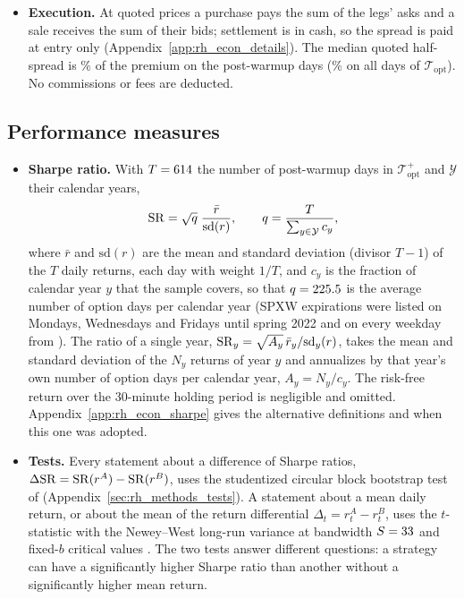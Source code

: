 \begin{itemize}
  (Table~\ref{tab:rh_oos}). On the HAR benchmark set the ridge, lasso and elastic-net forecasts coincide with
  the OLS (Table~\ref{tab:rh_econ_main}, note b), so the six HAR-set strategies hold \rhemHarDistinctWord{} distinct
  forecasts.
\item \textbf{Execution.} At quoted prices a purchase pays the sum of the legs' asks and a sale receives the sum of
  their bids; settlement is in cash, so the spread is paid at entry only (Appendix~\ref{app:rh_econ_details}). The
  median quoted half-spread is \rhemHalfSpreadMed\% of the premium on the \rheSzDays{} post-warmup days
  (\rhemHalfSpreadMedAll\% on all \cmNdays{} days of $\mathcal T_{\mathrm{opt}}$). No commissions or fees are
  deducted.
\end{itemize}

\subsection{Performance measures}
\label{sec:rh_econ_measures}
\begin{itemize}
\item \textbf{Sharpe ratio.} With $T = 614$ the number of post-warmup days in $\mathcal T_{\mathrm{opt}}^{+}$
  and $\mathcal Y$ their \rheNYears{} calendar years,
  \[
    \mathrm{SR} = \sqrt{q}\;\frac{\bar r}{\mathrm{sd}(r)},
    \qquad
    q = \frac{T}{\sum_{y \in \mathcal Y} c_y},
  \]
  where $\bar r$ and $\mathrm{sd}(r)$ are the mean and standard deviation (divisor $T - 1$) of the $T$ daily returns,
  each day with weight $1/T$, and $c_y$ is the fraction of calendar year $y$ that the sample covers, so that
  $q = 225.5$ is the average number of option days per calendar year (SPXW expirations were listed on Mondays,
  Wednesdays and Fridays until spring 2022 and on every weekday from \rheSplitDate). The ratio of a single year,
  $\mathrm{SR}_y = \sqrt{A_y}\,\bar r_y/\mathrm{sd}_y(r)$, takes the mean and standard deviation of the $N_y$ returns of year
  $y$ and annualizes by that year's own number of option days per calendar year, $A_y = N_y/c_y$. The risk-free
  return over the 30-minute holding period is negligible and omitted. Appendix~\ref{app:rh_econ_sharpe} gives the
  alternative definitions and when this one was adopted.
\item \textbf{Tests.} Every statement about a difference of Sharpe ratios, $\Delta\mathrm{SR} = \mathrm{SR}(r^A) - \mathrm{SR}(r^B)$, uses
  the studentized circular block bootstrap test of \citet{LedoitWolf2008} (Appendix~\ref{sec:rh_methods_tests}).
  A statement about
  a mean daily return, or about the mean of the return differential $\Delta_t = r^A_t - r^B_t$, uses the
  $t$-statistic with the Newey--West long-run variance at bandwidth $S = 33$ and fixed-$b$ critical values
  \citep{KieferVogelsang2005,LazarusLewisStockWatson2018}. The two tests answer different questions: a strategy can
  have a significantly higher Sharpe ratio than another without a significantly higher mean return.
\end{itemize}

